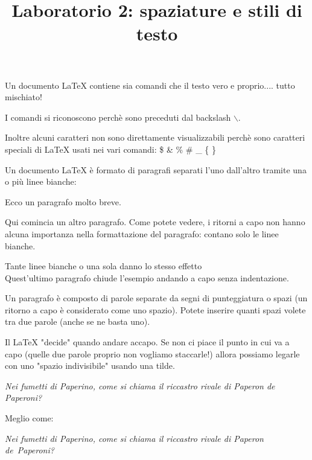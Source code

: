 \documentclass[12pt]{article}
\title{Laboratorio 2: spaziature e stili di testo 
}
\begin{document}
\maketitle
\date{  }

Un documento \LaTeX {} contiene sia                           comandi che il testo vero e proprio.... tutto mischiato! 

I comandi si riconoscono perch\`e sono preceduti dal backslash $\backslash$.

Inoltre alcuni caratteri non sono direttamente visualizzabili perch\`e sono caratteri speciali di \LaTeX {} usati nei vari comandi: 
\$ \& \% \# \_ \{ \}

\bigskip %

Un documento \LaTeX {} \`e formato di paragrafi separati l'uno dall'altro tramite una o
pi\`u linee bianche:

Ecco un paragrafo molto breve.

Qui comincia un altro paragrafo. Come potete vedere,
i ritorni a capo
 non hanno
alcuna importanza 
nella
formattazione 
del paragrafo: contano solo le linee bianche. 




Tante linee bianche o una sola danno lo stesso effetto
\\ %
Quest'ultimo paragrafo chiude l'esempio andando a capo senza indentazione. 
 


Un paragrafo \`e composto di parole separate da segni di punteggiatura o spazi (un
ritorno a capo \`e considerato come uno spazio). Potete                   inserire                       quanti 
spazi                    volete                                tra
due                          parole (anche se ne basta uno). 

\bigskip
Il \LaTeX{} "decide" quando andare accapo. Se non ci piace il punto in cui va a capo (quelle due parole proprio non vogliamo staccarle!) allora possiamo legarle con uno "spazio indivisibile" usando una tilde.

{\it Nei fumetti di Paperino, come si chiama  il riccastro rivale  di Paperon de Paperoni?}

Meglio come: 

{\it Nei fumetti di Paperino, come si chiama  il riccastro rivale  di Paperon de~Paperoni?}
\end{document}
